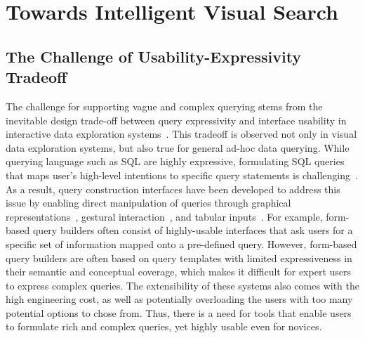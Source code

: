 \section{Towards Intelligent Visual Search}\label{sec:vague}
\subsection{The Challenge of Usability-Expressivity Tradeoff}
\par The challenge for supporting vague and complex querying stems from the inevitable design trade-off between query expressivity and interface usability in interactive data exploration systems~\cite{Jagadish2007,Morton2014}. This tradeoff is observed not only in visual data exploration systems, but also true for general ad-hoc data querying. While querying language such as SQL are highly expressive, formulating SQL queries that maps user's high-level intentions to specific query statements is challenging~\cite{Jagadish2007,Khoussainova2010}. As a result, query construction interfaces have been developed to address this issue by enabling direct manipulation of queries through graphical representations~\cite{Abouzied2012}, gestural interaction~\cite{Nandi2013}, and tabular inputs~\cite{Zloof1975,Embley1989}. For example, form-based query builders often consist of highly-usable interfaces that ask users for a specific set of information mapped onto a pre-defined query. However, form-based query builders are often based on query templates with limited expressiveness in their semantic and conceptual coverage, which makes it difficult for expert users to express complex queries. The extensibility of these systems also comes with the high engineering cost, as well as potentially overloading the users with too many potential options to chose from. Thus, there is a need for tools that enable users to formulate rich and complex queries, yet highly usable even for novices.  

